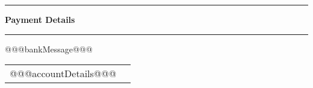 \documentclass[10pt,a4paper,twoside]{letter}
\begin{document}
\rule{\linewidth}{0.5mm}%

\begin{center}%
  \Large{\textbf{Payment Details}}\\ %
\end{center}%

\rule{\linewidth}{0.5mm}%

\leftskip=10pt

@@@bankMessage@@@%

\hspace{30pt}%
\begin{tabular}{ll}%
  @@@accountDetails@@@%
\end{tabular}%
\end{document}

